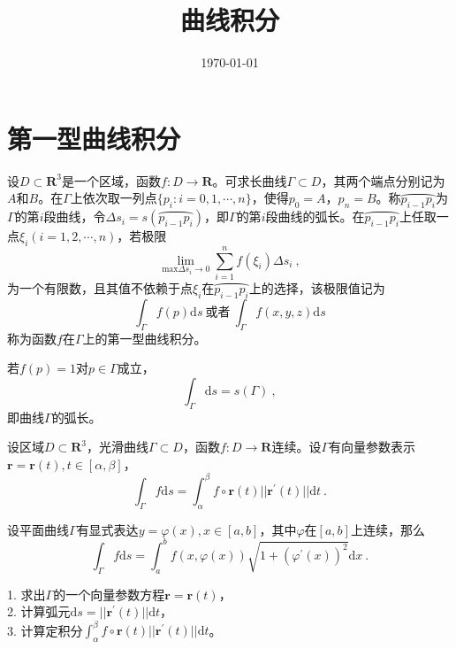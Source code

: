 \documentclass[12pt,a4paper]{article}
\title{曲线积分}
\author{}
\date{\today}
\renewcommand{\vec}[1]{\boldsymbol{#1}}
\newcommand{\dif}{\mathrm{d}}
\begin{document}
\maketitle


\section{第一型曲线积分}
\begin{tcolorbox}[colback=green!5,colframe=green!40!black,title= 定义]
设$D \subset \mathbf R^3$是一个区域，函数$f: D \rightarrow \mathbf R$。可求长曲线$\Gamma \subset D$，其两个端点分别记为$A$和$B$。在$\Gamma$上依次取一列点$\{p_i : i = 0, 1, \cdots, n \}$，使得$p_0 = A$，$ p_n = B$。称$\wideparen{p_{i-1}p_i}$为$\Gamma$的第$i$段曲线，令$\Delta s_i = s(\wideparen{p_{i-1}p_i})$，即$\Gamma$的第$i$段曲线的弧长。在$\wideparen{p_{i-1}p_i}$上任取一点$\xi_i(i = 1, 2, \cdots, n)$，若极限
\begin{equation}
\underset{\text{max} \Delta s_i \rightarrow 0}\lim \sum_{i=1}^n f(\xi_i) \Delta s_i ~,
\end{equation}
为一个有限数，且其值不依赖于点$\xi_i$在$\wideparen{p_{i-1}p_i}$上的选择，该极限值记为
\begin{equation*}
\int_\Gamma f(p) \dif s ~\text{或者} ~\int_\Gamma f(x, y, z) \dif s
\end{equation*}
称为函数$f$在$\Gamma$上的第一型曲线积分。
\end{tcolorbox}
若$f(p) = 1$对$p \in \Gamma$成立，
\begin{equation*}
\int_\Gamma \dif s = s(\Gamma) ~,
\end{equation*}
即曲线$\Gamma$的弧长。



\begin{tcolorbox}[colback=green!5,colframe=green!40!black,title= 定理]
设区域$D \subset \mathbf R^3$，光滑曲线$\Gamma \subset D$，函数$f: D \rightarrow \mathbf R$连续。设$\Gamma$有向量参数表示$\vec{r} = \vec{r}(t), t \in [\alpha, \beta]$，
\begin{equation}
\int_\Gamma f \dif s = \int_\alpha^\beta f\circ \vec{r}(t) ||\vec{r}^\prime(t) || \dif t~.
\end{equation}
\end{tcolorbox}


\begin{tcolorbox}[colback=green!5,colframe=green!40!black,title= 推论]
设平面曲线$\Gamma$有显式表达$y = \varphi(x), x \in [a, b]$，其中$\varphi$在$[a, b]$上连续，那么
\begin{equation}
\int_\Gamma f \dif s = \int_a^b f(x, \varphi(x)) \sqrt{1 +(\varphi^\prime(x) )^2} \dif x~.
\end{equation}
\end{tcolorbox}
1. 求出$\Gamma$的一个向量参数方程$\vec{r} = \vec{r}(t)$，\\
2. 计算弧元$\dif s = || \vec{r}^\prime(t) || \dif t$，\\
3. 计算定积分$\int_\alpha^\beta f\circ \vec{r}(t) ||\vec{r}^\prime(t) || \dif t$。
\end{document}
